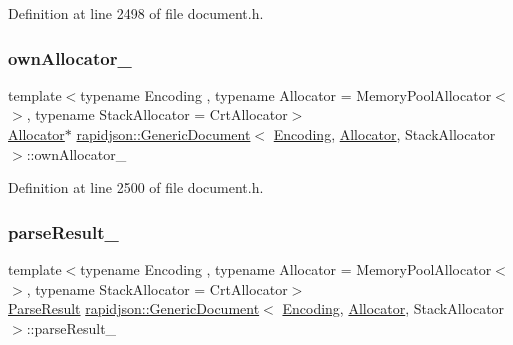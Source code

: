 Definition at line 2498 of file document.\+h.

\mbox{\label{classrapidjson_1_1_generic_document_af49b3668cb0b5a0561e5f26194ef2e31}} 
\subsubsection{\texorpdfstring{ownAllocator\_}{ownAllocator\_}}
{\footnotesize\ttfamily template$<$typename Encoding , typename Allocator  = Memory\+Pool\+Allocator$<$$>$, typename Stack\+Allocator  = Crt\+Allocator$>$ \\
\mbox{\hyperlink{classrapidjson_1_1_allocator}{Allocator}}$\ast$ \mbox{\hyperlink{classrapidjson_1_1_generic_document}{rapidjson\+::\+Generic\+Document}}$<$ \mbox{\hyperlink{classrapidjson_1_1_encoding}{Encoding}}, \mbox{\hyperlink{classrapidjson_1_1_allocator}{Allocator}}, Stack\+Allocator $>$\+::own\+Allocator\+\_\+\hspace{0.3cm}{\ttfamily [private]}}



Definition at line 2500 of file document.\+h.

\mbox{\label{classrapidjson_1_1_generic_document_a43e4cc449e68b2fb6ea6732b6a83d69e}} 
\subsubsection{\texorpdfstring{parseResult\_}{parseResult\_}}
{\footnotesize\ttfamily template$<$typename Encoding , typename Allocator  = Memory\+Pool\+Allocator$<$$>$, typename Stack\+Allocator  = Crt\+Allocator$>$ \\
\mbox{\hyperlink{structrapidjson_1_1_parse_result}{Parse\+Result}} \mbox{\hyperlink{classrapidjson_1_1_generic_document}{rapidjson\+::\+Generic\+Document}}$<$ \mbox{\hyperlink{classrapidjson_1_1_encoding}{Encoding}}, \mbox{\hyperlink{classrapidjson_1_1_allocator}{Allocator}}, Stack\+Allocator $>$\+::parse\+Result\+\_\+\hspace{0.3cm}{\ttfamily [private]}}



